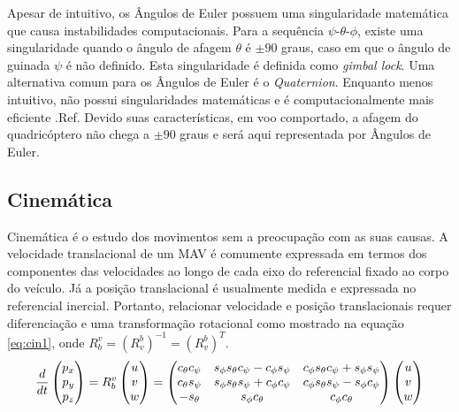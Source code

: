 \documentclass[a4paper, 12pt]{article}
\begin{document}
Apesar de intuitivo, os Ângulos de Euler possuem uma singularidade matemática que causa instabilidades computacionais. Para a sequência $\psi$-$\theta$-$\phi$, existe uma singularidade quando o ângulo de afagem $\theta$ é $\pm90$ graus, caso em que o ângulo de guinada $\psi$ é não definido. Esta singularidade é definida como \textit{gimbal lock}. Uma alternativa comum para os Ângulos de Euler é o \textit{Quaternion}. Enquanto menos intuitivo, não possui singularidades matemáticas e é computacionalmente mais eficiente .Ref. Devido suas características, em voo comportado, a afagem do quadricóptero não chega a $\pm90$ graus e será aqui representada por Ângulos de Euler.

\subsection{Cinemática}

Cinemática é o estudo dos movimentos sem a preocupação com as suas causas. A velocidade translacional de um MAV é comumente expressada em termos dos componentes das velocidades ao longo de cada eixo do referencial fixado ao corpo do veículo. Já a posição translacional é usualmente medida e expressada no referencial inercial. Portanto, relacionar velocidade e posição translacionais requer diferenciação e uma transformação rotacional como mostrado na equação \ref{eq:cin1}, onde 
${ R }_{ b }^{ v } = {({ R }_{ v }^{ b })}^{-1} = {({ R }_{ v }^{ b })}^T$.
\begin{equation}
\centering
\frac { d }{ dt } 
\begin{pmatrix} 
	{ p }_{ x } \\ { p }_{ y } \\ { p }_{ z } 
\end{pmatrix} = 
{ R }_{ b }^{ v }
\begin{pmatrix} { u } \\ { v } \\ { w }\end{pmatrix} = 
\begin{pmatrix} { c }_{ \theta  }{ c }_{ \psi  } & { s }_{ \phi  }{ s }_{ \theta  }{ c }_{ \psi  }-{ c }_{ \phi  }{ s }_{ \psi  } & { c }_{ \phi  }{ s }_{ \theta  }{ c }_{ \psi  }+{ s }_{ \phi  }{ s }_{ \psi  } \\ { c }_{ \theta  }s_{ \psi  } & { s }_{ \phi  }{ s }_{ \theta  }{ s }_{ \psi  }+{ c }_{ \phi  }{ c }_{ \psi  } & { c }_{ \phi  }{ s }_{ \theta  }{ s }_{ \psi  }-{ s }_{ \phi  }{ c }_{ \psi  } \\ -{ s }_{ \theta  } & { s }_{ \phi  }{ c }_{ \theta  } & { c }_{ \phi  }{ c }_{ \theta  } \end{pmatrix}
\begin{pmatrix}
	{ u } \\ { v } \\ { w } 
\end{pmatrix}
\label{eq:cin1}
\end{equation}
\end{document}
